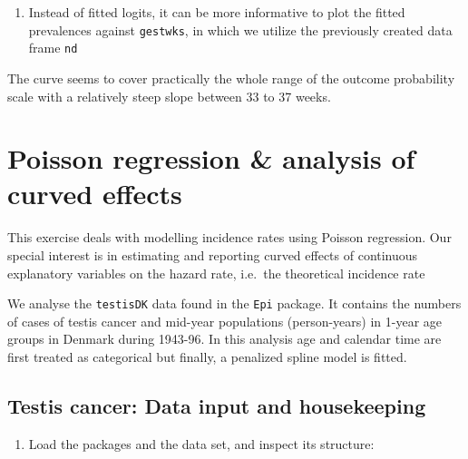 \documentclass[
]{book}
\newenvironment{Shaded}{\begin{snugshade}}{\end{snugshade}}
\newcommand{\AttributeTok}[1]{\textcolor[rgb]{0.13,0.29,0.53}{#1}}
\newcommand{\FunctionTok}[1]{\textcolor[rgb]{0.13,0.29,0.53}{\textbf{#1}}}
\newcommand{\NormalTok}[1]{#1}
\newcommand{\OtherTok}[1]{\textcolor[rgb]{0.56,0.35,0.01}{#1}}
\newcommand{\SpecialCharTok}[1]{\textcolor[rgb]{0.81,0.36,0.00}{\textbf{#1}}}
\newcommand{\StringTok}[1]{\textcolor[rgb]{0.31,0.60,0.02}{#1}}
\providecommand{\tightlist}{%
  \setlength{\itemsep}{0pt}\setlength{\parskip}{0pt}}
\begin{document}
\begin{enumerate}
\def\labelenumi{\arabic{enumi}.}
\setcounter{enumi}{5}
\tightlist
\item
  Instead of fitted logits, it can be more informative
  to plot the fitted prevalences against \texttt{gestwks},
  in which we utilize the previously created data frame \texttt{nd}
\end{enumerate}

\begin{Shaded}
\end{Shaded}

The curve seems to cover practically the whole range of
the outcome probability scale with a relatively
steep slope between 33 to 37 weeks.

\chapter{Poisson regression \& analysis of curved effects}\label{poisson-regression-analysis-of-curved-effects}

This exercise deals with modelling incidence rates
using Poisson regression. Our special interest is in
estimating and reporting curved effects of continuous
explanatory variables on the hazard rate, i.e.~the theoretical incidence rate

We analyse the \texttt{testisDK} data found in the
\texttt{Epi} package.
It contains the numbers of cases of testis cancer and mid-year
populations (person-years) in 1-year age groups in Denmark during
1943-96. In this analysis age and calendar time
are first treated as categorical
but finally, a penalized spline model is fitted.

\section{Testis cancer: Data input and housekeeping}\label{testis-cancer-data-input-and-housekeeping}

\begin{enumerate}
\def\labelenumi{\arabic{enumi}.}
\tightlist
\item
  Load the packages and the data set, and inspect its structure:
\end{enumerate}
\end{document}
